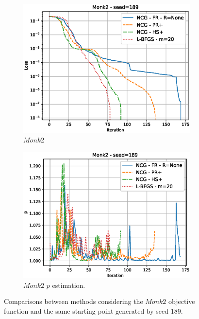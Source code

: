 \documentclass[11pt]{article}
\begin{document}
\begin{figure}[H]
\centering
\begin{subfigure}{.5\textwidth}
  \centering
  \includegraphics[width=1.1\linewidth]{Images/m2-189_comp.eps}
  \caption{$Monk2$}
  \label{fig:sub3}
\end{subfigure}%
\begin{subfigure}{.5\textwidth}
  \centering
  \includegraphics[width=1.1\linewidth]{Images/m2-189_comp_p.eps}
  \caption{$Monk2$ $p$ estimation.}
  \label{fig:sub4}
\end{subfigure}
\caption{Comparisons between methods considering the $Monk2$  objective function and the same starting point generated by seed 189.}
\label{fig:test2}
\end{figure}
\end{document}

